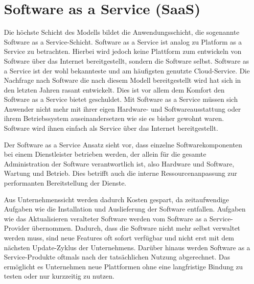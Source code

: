 \section{Software as a Service (SaaS)}
\label{sec:saas}
Die höchste Schicht des Modells bildet die Anwendungsschicht, die sogenannte Software as a Service-Schicht.
Software as a Service ist analog zu Platform as a Service zu betrachten. Hierbei wird jedoch keine Plattform zum entwickeln von Software über das Internet bereitgestellt, sondern die Software selbst. \cite{kepes_understanding_2014}
Software as a Service ist der wohl bekannteste und am häufigsten genutzte Cloud-Service. Die Nachfrage nach Software die nach diesem Modell bereitgestellt wird hat sich in den letzten Jahren rasant entwickelt. Dies ist vor allem dem Komfort den Software as a Service bietet geschuldet.
Mit Software as a Service müssen sich Anwender nicht mehr mit ihrer eigen Hardware- und Softwareausstattung oder ihrem Betriebssystem auseinandersetzen wie sie es bisher gewohnt waren. Software wird ihnen einfach als Service über das Internet bereitgestellt.

Der Software as a Service \glqq Ansatz sieht vor, dass einzelne Softwarekomponenten bei einem Dienstleister betrieben werden, der allein für die gesamte Administration der Software verantwortlich ist, also Hardware und Software, Wartung und Betrieb. Dies betrifft auch die interne Ressourcenanpassung zur performanten Bereitstellung der Dienste.\grqq \cite[S. 34]{meinel_virtualisierung_2011}

Aus Unternehmenssicht werden dadurch Kosten gespart, da zeitaufwendige Aufgaben wie die Installation und Auslieferung der Software entfallen. Aufgaben wie das Aktualisieren veralteter Software werden vom Software as a Service-Provider übernommen. Dadurch, dass die Software nicht mehr selbst verwaltet werden muss, sind neue Features oft sofort verfügbar und nicht erst mit dem nächsten Update-Zyklus der Unternehmens.
Darüber hinaus werden Software as a Service-Produkte oftmals nach der tatsächlichen Nutzung abgerechnet. Das ermöglicht es Unternehmen neue Plattformen ohne eine langfristige Bindung zu testen oder nur kurzzeitig zu nutzen.